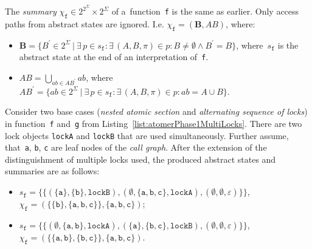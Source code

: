 The \emph{summary} $ \chi_\mathtt{f} \in 2^{2^\Sigma} \times 2^\Sigma $
of a~function~\texttt{f} is the same as earlier. Only access paths
from abstract states are ignored. I.e. $ \chi_\mathtt{f} = {(\boldsymbol{B},
AB)} $, where:
\begin{itemize}
    \item 
        $ \boldsymbol{B} = \{B^\prime \in 2^\Sigma\ |\ \exists\,p \in
        s_\mathtt{f} : \exists\,{(A, B, \pi)} \in p : B \neq \emptyset \wedge
        B^\prime = B\} $, where~$ s_\mathtt{f} $ is the abstract state at
        the end of an interpretation of~\texttt{f}.
        
    \item
        $ AB = \bigcup\limits_{ab \in AB^\prime} ab $,
        where $ AB^\prime = \{ab \in 2^\Sigma\ |\ \exists\,p \in
        s_\mathtt{f} : \exists\,(A, B, \pi) \in p: ab = {A \cup B}\} $.
\end{itemize}

\begin{example}
    Consider two base cases (\emph{nested atomic section} and
    \emph{alternating sequence of locks}) in function~\texttt{f}
    and~\texttt{g} from Listing~\ref{list:atomerPhase1MultiLocks}. There
    are two lock objects \texttt{lockA} and \texttt{lockB} that are used
    simultaneously. Further assume, that~\texttt{a}, \texttt{b},
    \texttt{c} are leaf nodes of the \emph{call graph}. After the
    extension of the distinguishment of multiple locks used,
    the produced abstract states and summaries are as follows:
    \begin{itemize}
        \item 
            $ s_\mathtt{f} = \{\{{(\{\mathtt{a}\}, \{\mathtt{b}\},
            \mathtt{lockB})}, {(\emptyset, \{\mathtt{a}, \mathtt{b},
            \mathtt{c}\}, \mathtt{lockA})}, {(\emptyset, \emptyset,
            \varepsilon)}\}\} $, \\
            $ \chi_\mathtt{f} = ({\{\{\mathtt{b}\}, \{\mathtt{a}, \mathtt{b},
            \mathtt{c}\}\}}, {\{\mathtt{a}, \mathtt{b}, \mathtt{c}\}}) $;

        \item 
            $ s_\mathtt{f} = \{\{{(\emptyset, \{\mathtt{a}, \mathtt{b}\},
            \mathtt{lockA})}, {(\{\mathtt{a}\}, \{\mathtt{b}, \mathtt{c}\},
            \mathtt{lockB})}, {(\emptyset, \emptyset, \varepsilon)}\}\} $, \\
            $ \chi_\mathtt{f} = ({\{\{\mathtt{a}, \mathtt{b}\}, \{\mathtt{b},
            \mathtt{c}\}\}}, {\{\mathtt{a}, \mathtt{b}, \mathtt{c}\}}) $.
    \end{itemize}
\end{example}

